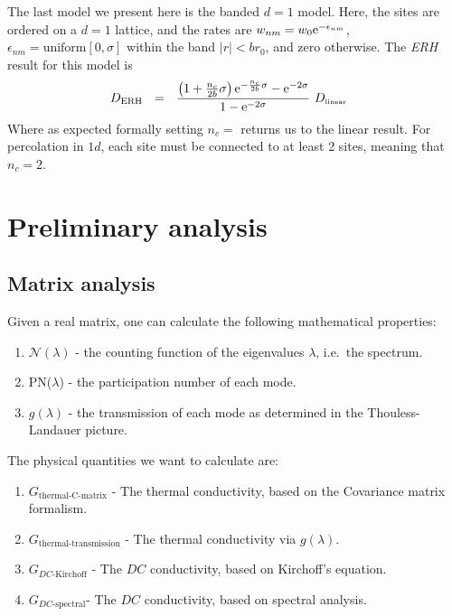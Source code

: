 The last model we present here is the banded $d=1$ model. Here,
the sites are ordered on a $d=1$ lattice, and the rates are
$w_{nm} = w_0\mbox{e}^{-\epsilon_{nm}}$,  
 $\epsilon_{nm} = \textrm{uniform} [0,\sigma]$ within the band $|r|<br_0$, and zero otherwise.
 The \emph{ERH} result for this model is
\begin{align}
D_{\text{ERH}} \ \ &=\ \ \frac{\left(1+\frac{n_c}{2b}\sigma\right)\eexp{-\frac{n_c}{2b}\sigma} - \eexp{-2\sigma}}
       {1 - \eexp{-2\sigma}}
   \ D_{\tbox{linear}}
\end{align}
Where as expected formally setting $n_c=$ returns us to the linear result. 
For percolation in $1d$, each site must be connected to at least 2 sites,
meaning that $n_c=2$.



\chapter{Preliminary analysis}



\section{Matrix analysis}


Given a real matrix, one can calculate the following
mathematical properties:
\begin{enumerate}
  \item  $\mathcal{N}(\lambda)$ -
         the counting function of the eigenvalues $\lambda$, i.e.\ the spectrum.
  \item  PN($\lambda$) -  the participation number of each mode.
  \item  $g(\lambda)$  -  the transmission of each mode as determined in the 
          Thouless-Landauer picture.
\end{enumerate}
The physical quantities we want to calculate are:
\begin{enumerate}[label={\Alph*.}]
\item  $G_{\textrm{thermal-C-matrix}}$ - The thermal conductivity, based
       on the Covariance matrix formalism.
\item  $G_{\textrm{thermal-transmission}}$ - The thermal conductivity via $g(\lambda)$.
\item  $G_{DC\textrm{-Kirchoff}}$ - The $DC$ conductivity, based 
       on Kirchoff's equation.
\item  $G_{DC\textrm{-spectral}}$-  The $DC$ conductivity, based 
       on spectral analysis.
\end{enumerate}


